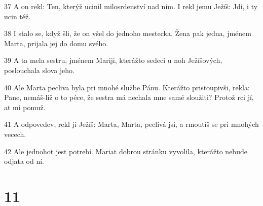 \par 37 A on rekl: Ten, kterýž ucinil milosrdenství nad ním. I rekl jemu Ježíš: Jdi, i ty ucin též.
\par 38 I stalo se, když šli, že on všel do jednoho mestecka. Žena pak jedna, jménem Marta, prijala jej do domu svého.
\par 39 A ta mela sestru, jménem Mariji, kterážto sedeci u noh Ježíšových, poslouchala slova jeho.
\par 40 Ale Marta pecliva byla pri mnohé službe Pánu. Kterážto pristoupivši, rekla: Pane, nemáš-liž o to péce, že sestra má nechala mne samé sloužiti? Protož rci jí, at mi pomuž.
\par 41 A odpovedev, rekl jí Ježíš: Marta, Marta, peclivá jsi, a rmoutíš se pri mnohých vecech.
\par 42 Ale jednohot jest potrebí. Mariat dobrou stránku vyvolila, kterážto nebude odjata od ní.

\chapter{11}

